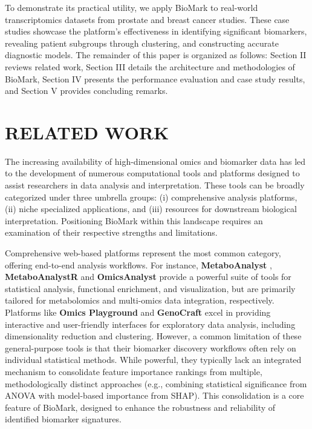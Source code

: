 \documentclass[journal]{IEEEtran}
\begin{document}
To demonstrate its practical utility, we apply BioMark to real-world transcriptomics datasets from prostate and breast cancer studies. These case studies showcase the platform's effectiveness in identifying significant biomarkers, revealing patient subgroups through clustering, and constructing accurate diagnostic models. The remainder of this paper is organized as follows: Section II reviews related work, Section III details the architecture and methodologies of BioMark, Section IV presents the performance evaluation and case study results, and Section V provides concluding remarks.

\section{RELATED WORK}
The increasing availability of high-dimensional omics and biomarker data has led to the development of numerous computational tools and platforms designed to assist researchers in data analysis and interpretation. These tools can be broadly categorized under three umbrella groups: (i) comprehensive analysis platforms, (ii) niche specialized applications, and (iii) resources for downstream biological interpretation. Positioning BioMark within this landscape requires an examination of their respective strengths and limitations.

Comprehensive web-based platforms represent the most common category, offering end-to-end analysis workflows. For instance, \textbf{MetaboAnalyst} \cite{MetaboAnalyst_2009}, \textbf{MetaboAnalystR} \cite{MetaboAnalystR_2018} and \textbf{OmicsAnalyst} \cite{OmicsAnalyst_2021} provide a powerful suite of tools for statistical analysis, functional enrichment, and visualization, but are primarily tailored for metabolomics and multi-omics data integration, respectively. Platforms like \textbf{Omics Playground} \cite{Akhmedov2020_OmicsPlayground} and \textbf{GenoCraft} \cite{Lu2024_GenoCraft} excel in providing interactive and user-friendly interfaces for exploratory data analysis, including dimensionality reduction and clustering. However, a common limitation of these general-purpose tools is that their biomarker discovery workflows often rely on individual statistical methods. While powerful, they typically lack an integrated mechanism to consolidate feature importance rankings from multiple, methodologically distinct approaches (e.g., combining statistical significance from ANOVA with model-based importance from SHAP). This consolidation is a core feature of BioMark, designed to enhance the robustness and reliability of identified biomarker signatures.
\end{document}
